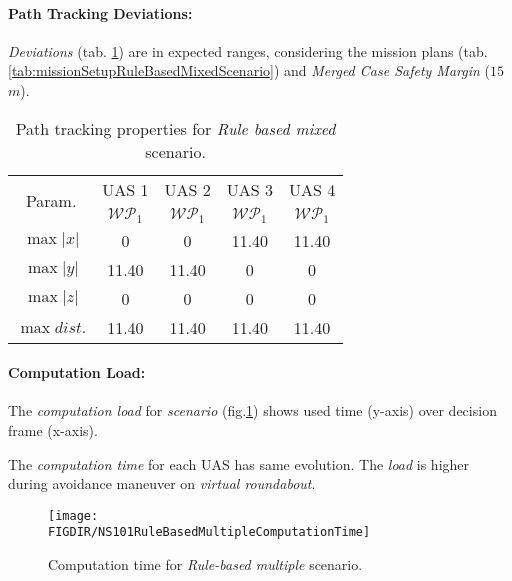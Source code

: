 \paragraph{Path Tracking Deviations:} \emph{Deviations} (tab. \ref{tab:pathTrackingParametersForRuleBasedMixed}) are in expected ranges, considering the mission plans (tab. \ref{tab:missionSetupRuleBasedMixedScenario}) and \emph{Merged Case Safety Margin} ($15$ $m$).

\begin{table}[H]
	\centering
	\begin{tabular}{c||c|c|c|c}
		\multirow{2}{*}{Param.} & UAS 1     & UAS 2             & UAS 3             & UAS 4 \\\cline{2-5}
						& $\mathscr{WP}_1$  & $\mathscr{WP}_1$  & $\mathscr{WP}_1$  & $\mathscr{WP}_1$ \\\hline\hline
		  $\max |x|$    & 0                 & 0                 & 11.40             & 11.40\\\hline
		  $\max |y|$    & 11.40             & 11.40             & 0                 & 0\\\hline
		  $\max |z|$    & 0                 & 0                 & 0                 & 0\\\hline
		  $\max dist.$  & 11.40             & 11.40             & 11.40              & 11.40\\
	\end{tabular}
	\caption{Path tracking properties for \emph{Rule based mixed} scenario.}
	\label{tab:pathTrackingParametersForRuleBasedMixed}
\end{table}


\paragraph{Computation Load:} The \emph{computation load} for \emph{scenario} (fig.\ref{fig:ruleBasedMultipleComputationTime}) shows used time (y-axis) over decision frame (x-axis).

The \emph{computation time} for each UAS has same evolution. The \emph{load} is higher  during avoidance maneuver on \emph{virtual roundabout}.

\begin{figure}[H]
\centering
\texttt{[image: \\FIGDIR/NS101RuleBasedMultipleComputationTime]} 
\caption{Computation time for \emph{Rule-based multiple} scenario.}
\label{fig:ruleBasedMultipleComputationTime}
\end{figure}